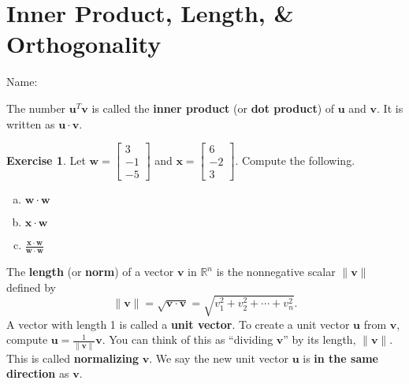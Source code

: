 \documentclass[10pt]{book}
\newcommand{\boxcolor}{gray!30}
\newenvironment{boxdef}{\begin{mdframed}[backgroundcolor=\boxcolor,linewidth=0pt,nobreak=true]}{\end{mdframed}}
\theoremstyle{definition}
\newtheorem{exercise}{Exercise}[section]
\newcommand{\name}[1][2.5in]{\vspace{-2.3em}\hfill Name: \underline{\hspace{#1}}}
\newcommand{\R}{\mathbb{R}}
\newcommand{\vect}[1]{\ensuremath{\boldsymbol{\mathbf{#1}}}}
\begin{document}
\section[Inner Prod., Length, \& Orth.]{Inner Product, Length, \& Orthogonality}
\name[1.5in]


\begin{boxdef}
	The number $\vect{u}^T\vect{v}$ is called the \textbf{inner product} (or \textbf{dot product}) of $\vect{u}$ and $\vect{v}$. It is written as $\vect{u}\cdot\vect{v}$.
\end{boxdef}


\begin{exercise} %
	Let $\vect{w}=\begin{bmatrix}3\\-1\\-5\end{bmatrix}$ and $\vect{x}=\begin{bmatrix}6\\-2\\3\end{bmatrix}$. Compute the following.
	\begin{multicols}{2}
		\begin{enumerate}[(a)]
			\item $\vect{w}\cdot\vect{w}$
			\vspace{5em}
			\item $\vect{x}\cdot\vect{w}$
			\columnbreak
			\item $\frac{\vect{x}\cdot\vect{w}}{\vect{w}\cdot\vect{w}}$
		\end{enumerate}
	\end{multicols}
	\vspace{5em}
\end{exercise}


\begin{boxdef}
	The \textbf{length} (or \textbf{norm}) of a vector $\vect{v}$ in $\R^n$ is the nonnegative scalar $\|\vect{v}\|$ defined by
	$$ \|\vect{v}\| = \sqrt{\vect{v}\cdot\vect{v}} = \sqrt{v_1^2+v_2^2+\cdots+v_n^2}. $$
	A vector with length 1 is called a \textbf{unit vector}. To create a unit vector $\vect{u}$ from $\vect{v}$, compute $\vect{u}=\frac{1}{\|\vect{v}\|}\vect{v}$. You can think of this as ``dividing $\vect{v}$'' by its length, $\|\vect{v}\|$. This is called \textbf{normalizing} $\vect{v}$. We say the new unit vector $\vect{u}$ is \textbf{in the same direction} as $\vect{v}$.
\end{boxdef}
\end{document}
